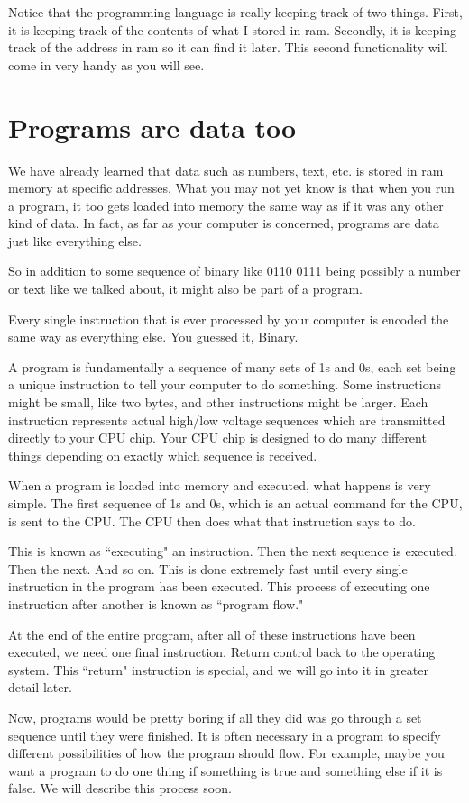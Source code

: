 \documentclass[a4paper,12pt]{article}
\let\stdsection\section
\renewcommand\section{\newpage\stdsection}
\begin{document}
Notice that the programming language is really keeping track of two things. First, it is keeping track of the contents of what I stored in ram. Secondly, it is keeping track of the address in ram so it can find it later. This second functionality will come in very handy as you will see.
\section{Programs are data too}
We have already learned that data such as numbers, text, etc. is stored in ram memory at specific addresses. What you may not yet know is that when you run a program, it too gets loaded into memory the same way as if it was any other kind of data. In fact, as far as your computer is concerned, programs are data just like everything else.

So in addition to some sequence of binary like 0110 0111 being possibly a number or text like we talked about, it might also be part of a program.

Every single instruction that is ever processed by your computer is encoded the same way as everything else. You guessed it, Binary.

A program is fundamentally a sequence of many sets of 1s and 0s, each set being a unique instruction to tell your computer to do something. Some instructions might be small, like two bytes, and other instructions might be larger. Each instruction represents actual high/low voltage sequences which are transmitted directly to your CPU chip. Your CPU chip is designed to do many different things depending on exactly which sequence is received.

When a program is loaded into memory and executed, what happens is very simple. The first sequence of 1s and 0s, which is an actual command for the CPU, is sent to the CPU. The CPU then does what that instruction says to do.

This is known as ``executing" an instruction. Then the next sequence is executed. Then the next. And so on. This is done extremely fast until every single instruction in the program has been executed. This process of executing one instruction after another is known as ``program flow."

At the end of the entire program, after all of these instructions have been executed, we need one final instruction. Return control back to the operating system. This ``return" instruction is special, and we will go into it in greater detail later.

Now, programs would be pretty boring if all they did was go through a set sequence until they were finished. It is often necessary in a program to specify different possibilities of how the program should flow. For example, maybe you want a program to do one thing if something is true and something else if it is false. We will describe this process soon.
\end{document}
